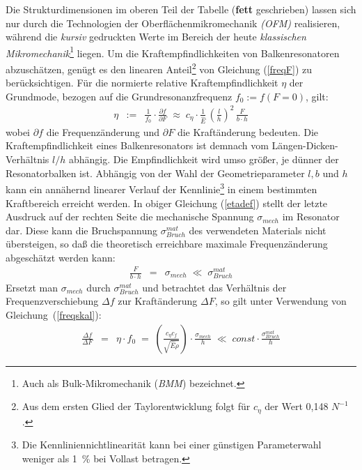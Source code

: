 Die Strukturdimensionen im oberen Teil der Tabelle ({\bf fett}
geschrieben) lassen
sich nur durch die Technologien der Oberflächenmikromechanik
{\em (OFM)} realisieren, während die {\em kursiv}
gedruckten Werte im Bereich der heute {\em klassischen
Mikromechanik}\footnote{Auch als Bulk-Mikromechanik ({\em BMM}) bezeichnet.}
liegen. Um die Kraftempfindlichkeiten
von Balkenresonatoren abzuschätzen, genügt es den linearen
Anteil\footnote{Aus dem ersten Glied der Taylorentwicklung folgt für
$c_{\eta}$ der Wert 0,148 $N^{-1}$.} von Gleichung (\ref{freqF})
zu berücksichtigen. Für die normierte relative Kraftempfindlichkeit
$\eta$ der Grundmode, bezogen auf die Grundresonanzfrequenz
$f_{0} := f(F=0)$, gilt:
%
\begin{eqnarray}
\label{etadef}
     \eta & := & \frac{1}{f_{0}} \cdot \frac{\partial f}{\partial F}
          \; \approx \; c_{\eta} \cdot \frac{1}{\hat E} \,
            \left( \frac{l}{h} \right)^{2} \, \frac{F}{b \cdot h}
\end{eqnarray}
%
wobei $\partial f$ die Frequenzänderung und $\partial F$ die Kraftänderung
bedeuten.
Die Kraftempfindlichkeit eines Balkenresonators ist demnach vom
Längen-Dicken-Verhältnis $ l/h $ abhängig.  Die Empfindlichkeit wird
umso größer, je dünner der Resonatorbalken ist.  Abhängig von der Wahl
der Geometrieparameter $l, b$ und $h$ kann ein annähernd linearer
Verlauf der Kennlinie\footnote{Die Kennliniennichtlinearität kann bei
einer günstigen Parameterwahl weniger als 1~\% bei Vollast betragen.} in
einem bestimmten Kraftbereich erreicht werden.  In obiger Gleichung
(\ref{etadef})
stellt der letzte Ausdruck auf der rechten Seite die mechanische
Spannung $\sigma_{mech}$ im Resonator dar.  Diese kann die
Bruchspannung $\sigma_{Bruch}^{mat}$ des verwendeten Materials nicht
übersteigen, so daß die theoretisch erreichbare maximale
Frequenzänderung abgeschätzt werden kann:
%
\begin{eqnarray}
     \frac{F}{b \cdot h} & = & \sigma_{mech}
     \; \ll \; \sigma_{Bruch}^{mat}
\end{eqnarray}
%
Ersetzt man $\sigma_{mech}$ durch $\sigma_{Bruch}^{mat}$ und betrachtet
das Verhältnis der Frequenzverschiebung $\Delta f$ zur Kraftänderung
$\Delta F$, so gilt unter Verwendung von Gleichung~(\ref{freqskal}):
%
\begin{eqnarray}
\label{etaf}
    \frac{\Delta f}{\Delta F} & = & \eta \cdot f_{0} \; = \;
     \left( \frac{c_{\eta}c_{f}}{\sqrt{\hat E \rho}} \right) \cdot
     \frac{\sigma_{mech}}{h} \; \ll \; const \cdot
     \frac{\sigma_{Bruch}^{mat}}{h}
\end{eqnarray}
